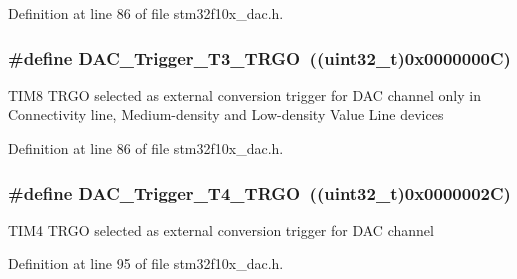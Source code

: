 Definition at line 86 of file stm32f10x\+\_\+dac.\+h.

\subsubsection[{\texorpdfstring{D\+A\+C\+\_\+\+Trigger\+\_\+\+T3\+\_\+\+T\+R\+GO}{DAC_Trigger_T3_TRGO}}]{\setlength{\rightskip}{0pt plus 5cm}\#define D\+A\+C\+\_\+\+Trigger\+\_\+\+T3\+\_\+\+T\+R\+GO~(({\bf uint32\+\_\+t})0x0000000\+C)}\hypertarget{group___d_a_c__trigger__selection_ga82cbaedc35164c8b9fe0be2faec9b909}{}\label{group___d_a_c__trigger__selection_ga82cbaedc35164c8b9fe0be2faec9b909}
T\+I\+M8 T\+R\+GO selected as external conversion trigger for D\+AC channel only in Connectivity line, Medium-\/density and Low-\/density Value Line devices 

Definition at line 86 of file stm32f10x\+\_\+dac.\+h.

\subsubsection[{\texorpdfstring{D\+A\+C\+\_\+\+Trigger\+\_\+\+T4\+\_\+\+T\+R\+GO}{DAC_Trigger_T4_TRGO}}]{\setlength{\rightskip}{0pt plus 5cm}\#define D\+A\+C\+\_\+\+Trigger\+\_\+\+T4\+\_\+\+T\+R\+GO~(({\bf uint32\+\_\+t})0x0000002\+C)}\hypertarget{group___d_a_c__trigger__selection_ga58ccb2de3d22d66ee975152f5edb330a}{}\label{group___d_a_c__trigger__selection_ga58ccb2de3d22d66ee975152f5edb330a}
T\+I\+M4 T\+R\+GO selected as external conversion trigger for D\+AC channel 

Definition at line 95 of file stm32f10x\+\_\+dac.\+h.

